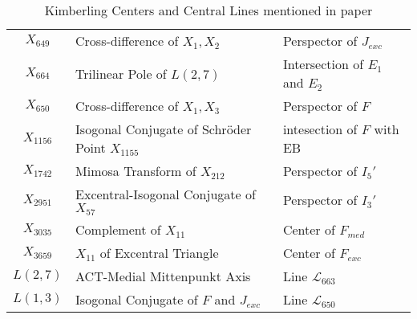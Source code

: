 \begin{table}
\begin{tabular}{|c|l|l|}
$X_{649}$ & Cross-difference of $X_1,X_2$ & Perspector of $J_{exc}$ \\ 
$X_{664}$ &  Trilinear Pole of $L( 2,7)$ & Intersection of $E_1$ and $E_2$ \cite{moses2020-private-circumconic} \\
$X_{650}$ & Cross-difference of $X_1,X_3$ & Perspector of $F$ \\
$X_{1156}$ & \makecell[tl]{Isogonal Conjugate of\\Schröder Point $X_{1155}$} &  intesection of $F$ with EB \\
$X_{1742}$ & Mimosa Transform of $X_{212}$ & Perspector of $I_5'$ \\
$X_{2951}$ & Excentral-Isogonal Conjugate of $X_{57}$ & Perspector of $I_3'$ \\
$X_{3035}$ & Complement of $X_{11}$ & Center of $F_{med}$ \\
$X_{3659}$ & $X_{11}$ of Excentral Triangle & Center of $F_{exc}$ \\
\hline
$L(2,7)$ & ACT-Medial Mittenpunkt Axis & Line $\mathcal{L}_{663}$  \cite{etc_central_lines} \\
$L(1,3)$ & Isogonal Conjugate of $F$ and $J_{exc}$ &  Line $\mathcal{L}_{650}$ \cite{etc_central_lines}  \\
\hline
\end{tabular}
\caption{Kimberling Centers and Central Lines mentioned in paper}
\label{tab:kimberling}
\end{table}


